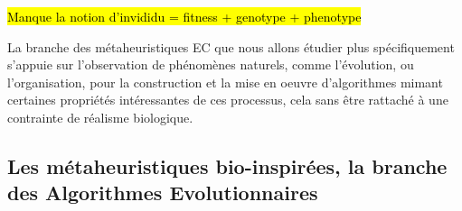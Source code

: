 \hl{Manque la notion d'invididu = fitness + genotype + phenotype}








La branche des métaheuristiques EC que nous allons étudier plus spécifiquement s'appuie sur l'observation de phénomènes naturels, comme l'évolution, ou l'organisation, pour la construction et la mise en oeuvre d'algorithmes mimant certaines propriétés intéressantes de ces processus, cela sans être rattaché à une contrainte de réalisme biologique.

\subsection{Les métaheuristiques bio-inspirées, la branche des Algorithmes Evolutionnaires}
\label{ssec:EA}


